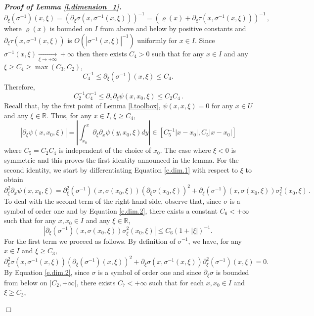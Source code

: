 \documentclass[10pt,twoside]{article}
\newcommand{\R}{\mathbb{R}}
\newcommand{\pfty}{+\infty}
\newenvironment{prf}[1][]
{\vskip 2mm  {\it \bf Proof#1. }}{$\Box$ \vskip 2mm}
\numberwithin{theorem}{section}
\begin{document}
\begin{prf}[ of Lemma \ref{l.dimension_1}]
  \[
  \partial_\xi(\sigma^{-1})(x,\xi)=\left(\partial_\xi\sigma(x,\sigma^{-1}(x,\xi))\right)^{-1}=\left(\varrho(x)+\partial_\xi\tau(x,\sigma^{-1}(x,\xi))\right)^{-1}\, ,
  \]
  where $\varrho(x)$ is bounded on $I$ from above and below by positive constants and $\partial_\xi\tau(x,\sigma^{-1}(x,\xi))$ is $O(|\sigma^{-1}(x,\xi)|^{-1})$ uniformly for $x\in I$. Since $\sigma^{-1}(x,\xi)\xrightarrow[\xi\to\pfty]{}\pfty$ then there exists $C_4>0$ such that for any $x\in I$ and any $\xi\geq C_4\geq \max(C_3,C_2)$,
  \begin{equation}\label{e.dim.2}
  C_4^{-1}\leq\partial_\xi(\sigma^{-1})(x,\xi)\leq C_4.\,
  \end{equation}
  Therefore,
  \[
  C_2^{-1}C_4^{-1}\leq\partial_x\partial_\xi\psi(x,x_0,\xi)\leq C_2C_4\,.\]
  Recall that, by the first point of Lemma \ref{l.toolbox}, $\psi(x,x,\xi)=0$ for any $x\in U$ and any $\xi\in\R$. Thus, for any $x\in I$, $\xi\geq C_4$,
  \[
  |\partial_\xi\psi(x,x_0,\xi)|=\left|\int_{x_0}^x\partial_\xi\partial_x\psi(y,x_0,\xi)dy\right|\in\left[C_5^{-1}|x-x_0|,C_5|x-x_0|\right]
  \]
where $C_5=C_2C_4$ is independent of the choice of $x_0$. The case where $\xi<0$ is symmetric and this proves the first identity announced in the lemma. For the second identity, we start by differentiating Equation \eqref{e.dim.1} with respect to $\xi$ to obtain
\begin{equation}\label{e.dim.3}
\partial_\xi^2\partial_x\psi(x,x_0,\xi)=\partial_\xi^2(\sigma^{-1})(x,\sigma(x_0,\xi))(\partial_\xi\sigma(x_0,\xi))^2+\partial_\xi(\sigma^{-1})(x,\sigma(x_0,\xi))\sigma_\xi^2(x_0,\xi)\, .
\end{equation}
To deal with the second term of the right hand side, observe that, since $\sigma$ is a symbol of order one and by Equation \eqref{e.dim.2}, there exists a constant $C_6<+\infty$ such that for any $x,x_0\in I$ and any $\xi\in\R$,
\begin{equation}\label{e.dim.4}
\left|\partial_\xi(\sigma^{-1})(x,\sigma(x_0,\xi))\sigma_\xi^2(x_0,\xi)\right|\leq C_6(1+|\xi|)^{-1}.\, 
\end{equation}
For the first term we proceed as follows. By definition of $\sigma^{-1}$, we have, for any $x\in I$ and $\xi\geq C_3$,
\[
\partial_\xi^2\sigma(x,\sigma^{-1}(x,\xi))(\partial_\xi(\sigma^{-1})(x,\xi))^2+\partial_\xi\sigma(x,\sigma^{-1}(x,\xi))\partial_\xi^2(\sigma^{-1})(x,\xi)=0.\, 
\]
By Equation \eqref{e.dim.2}, since $\sigma$ is a symbol of order one and since $\partial_\xi\sigma$ is bounded from below on $[C_2,+\infty[$, there exists $C_7<+\infty$ such that for each $x,x_0\in I$ and $\xi\geq C_3$,

\end{prf}
\end{document}
